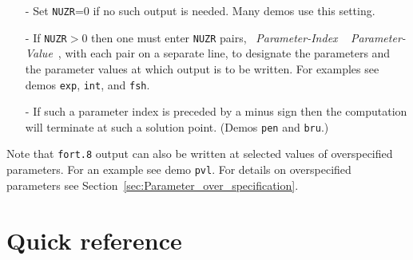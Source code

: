 \documentclass[12pt]{report}
\begin{document}
\begin{itemize}
\item[-]
 Set {\tt NUZR}=0 if no such output is needed. Many demos use this setting.
\item[-]
 If {\tt NUZR}$>$0 then one must enter {\tt NUZR} pairs,
            ~{\it Parameter-Index} ~ {\it Parameter-Value}~,
 with each pair on a separate line, to designate the parameters and the parameter
 values at which output is to be written.
 For examples see demos {\tt exp}, {\tt int}, and {\tt fsh}.
\item[-]
 If such a parameter index is preceded by a minus sign then the computation will
 terminate at such a solution point.
 (Demos {\tt pen} and {\tt bru}.)
\end{itemize}

Note that {\tt fort.8} output can also be written at selected values of 
overspecified parameters. For an example see demo {\tt pvl}.
For details on overspecified parameters see 
Section~\ref{sec:Parameter_over_specification}.

\section{Quick reference}
\end{document}
